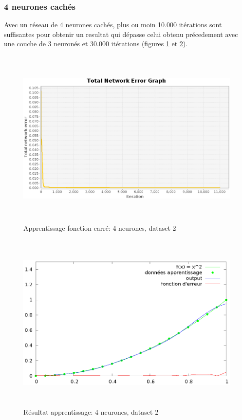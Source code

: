 \documentclass[twoside,openright,a4paper,11pt,french]{article}
\begin{document}
\subsubsection{4 neurones cachés}

Avec un réseau de 4 neurones cachés, plus ou moin 10.000 itérations
sont suffisantes pour obtenir un resultat qui dépasse celui obtenu
précedement avec une couche de 3 neuronés et 30.000 itérations 
(figures \ref{fig:sqtest4} et \ref{fig:chartsqtest4}).


\begin{figure}[ht]
\centering
\includegraphics[width=12cm,height=9cm]{./pics/sqtest4.eps}
\caption{Apprentissage fonction carré: 4 neurones, dataset 2}
\label{fig:sqtest4}
\end{figure}

\begin{figure}[ht]
\centering
\includegraphics[width=12cm,height=9cm]{./pics/chartsqtest4.eps}
\caption{Résultat apprentissage: 4 neurones, dataset 2}
\label{fig:chartsqtest4}
\end{figure}
\end{document}
